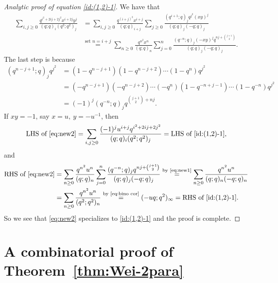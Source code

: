 \documentclass[11pt,reqno]{amsart}
\numberwithin{equation}{section}
\theoremstyle{plain}
\theoremstyle{definition}
\begin{document}
\begin{proof}[Analytic proof of equation \eqref{id:(1,2)-1}]
We have that 
\begin{equation}
\begin{aligned}
\sum\limits_{i, j\geq 0}\frac{q^{i^2+2ij+2j^2}x^{i+2j}y^{j}}{(q; q)_{i}(q^2; q^2)_{j}}&=\sum\limits_{i, j\geq 0}\frac{q^{(i+j)^{2}}x^{i+j}}{(q; q)_{i+j}}\sum\limits_{j\geq 0}\frac{(q^{i+1}; q)_{j}q^{j^2}(xy)^{j}}{(q; q)_{j}(-q; q)_{j}}\\
&\overset{\text{set $n=i+j$}}{=}\sum\limits_{n\geq 0}\frac{q^{n^2}x^n}{(q; q)_{n}}\sum\limits_{j=0}^{n}\frac{(q^{-n}; q)_{j}(-xy)^{j}q^{nj+\binom{j+1}{2}}}{(q; q)_{j}(-q; q)_{j}}.\label{eq:new2}
\end{aligned}
\end{equation}
The last step is because
$$
\begin{aligned}
(q^{n-j+1}; q)_{j}q^{j^2}&=(1-q^{n-j+1})(1-q^{n-j+2})\cdots(1-q^n)q^{j^2}\\
&=(-q^{n-j+1})(-q^{n-j+2})\cdots (-q^n)(1-q^{-n+j-1})\cdots(1-q^{-n})q^{j^2}\\
&=(-1)^{j}(q^{-n}; q)_{j}q^{\binom{j+1}{2}+nj}.
\end{aligned}
$$
If $xy=-1$, say $x=u,~y=-u^{-1}$, then 
$$
\text{LHS of \eqref{eq:new2}}=\sum\limits_{i, j\geq 0}\frac{(-1)^{j}u^{i+j}q^{i^2+2ij+2j^2}}{(q; q)_{i}(q^2; q^2)_{j}}=\text{LHS of \eqref{id:(1,2)-1}},
$$
and
$$
\begin{aligned}
\text{RHS of \eqref{eq:new2}}&=\sum\limits_{n\geq 0}\frac{q^{n^2}u^n}{(q; q)_{n}}\sum\limits_{j=0}^{n}\frac{(q^{-n}; q)_{j}q^{nj+\binom{j+1}{2}}}{(q; q)_{j}(-q; q)_{j}} \overset{\text{by \eqref{eq:new1}}}{=}\sum\limits_{n\geq 0}\frac{q^{n^2}u^n}{(q; q)_{n}(-q; q)_{n}}\\
&=\sum\limits_{n\geq 0}\frac{q^{n^2}u^n}{(q^2; q^2)_{n}}\overset{\text{by \eqref{eq:bino cor}}}{=}(-uq; q^2)_{\infty}=\text{RHS of \eqref{id:(1,2)-1}}.
\end{aligned}
$$
So we see that \eqref{eq:new2} specializes to \eqref{id:(1,2)-1} and the proof is complete. 

\end{proof}










\section{A combinatorial proof of Theorem~\ref{thm:Wei-2para}}\label{sec:Wei}
\end{document}
